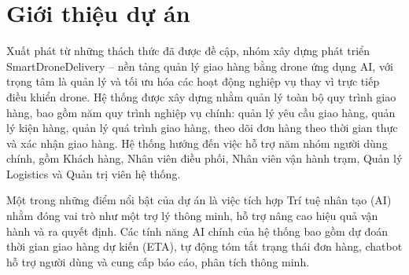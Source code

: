 \section{Giới thiệu dự án}

Xuất phát từ những thách thức đã được đề cập, nhóm xây dựng phát triển SmartDroneDelivery -- nền tảng quản lý giao hàng bằng drone ứng dụng AI, với trọng tâm là quản lý và tối ưu hóa các hoạt động nghiệp vụ thay vì trực tiếp điều khiển drone. Hệ thống được xây dựng nhằm quản lý toàn bộ quy trình giao hàng, bao gồm năm quy trình nghiệp vụ chính: quản lý yêu cầu giao hàng, quản lý kiện hàng, quản lý quá trình giao hàng, theo dõi đơn hàng theo thời gian thực và xác nhận giao hàng. Hệ thống hướng đến việc hỗ trợ năm nhóm người dùng chính, gồm Khách hàng, Nhân viên điều phối, Nhân viên vận hành trạm, Quản lý Logistics và Quản trị viên hệ thống.

Một trong những điểm nổi bật của dự án là việc tích hợp Trí tuệ nhân tạo (AI) nhằm đóng vai trò như một trợ lý thông minh, hỗ trợ nâng cao hiệu quả vận hành và ra quyết định. Các tính năng AI chính của hệ thống bao gồm dự đoán thời gian giao hàng dự kiến (ETA), tự động tóm tắt trạng thái đơn hàng, chatbot hỗ trợ người dùng và cung cấp báo cáo, phân tích thông minh.


